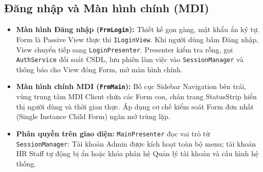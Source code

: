 \documentclass[12pt,a4paper]{report}
\begin{document}
\subsection{Đăng nhập và Màn hình chính (MDI)}
\begin{itemize}[leftmargin=1.0cm]
    \item \textbf{Màn hình Đăng nhập (\texttt{FrmLogin}):} Thiết kế gọn gàng, mật khẩu ẩn ký tự. Form là Passive View thực thi \texttt{ILoginView}. Khi người dùng bấm Đăng nhập, View chuyển tiếp sang \texttt{LoginPresenter}. Presenter kiểm tra rỗng, gọi \texttt{AuthService} đối soát CSDL, lưu phiên làm việc vào \texttt{SessionManager} và thông báo cho View đóng Form, mở màn hình chính.
    \item \textbf{Màn hình chính MDI (\texttt{FrmMain}):} Bố cục Sidebar Navigation bên trái, vùng trung tâm MDI Client chứa các Form con, chân trang StatusStrip hiển thị người dùng và thời gian thực. Áp dụng cơ chế kiểm soát Form đơn nhất (Single Instance Child Form) ngăn mở trùng lặp.
    \item \textbf{Phân quyền trên giao diện:} \texttt{MainPresenter} đọc vai trò từ \texttt{SessionManager}: Tài khoản Admin được kích hoạt toàn bộ menu; tài khoản HR Staff tự động bị ẩn hoặc khóa phân hệ Quản lý tài khoản và cấu hình hệ thống.
\end{itemize}
\end{document}
